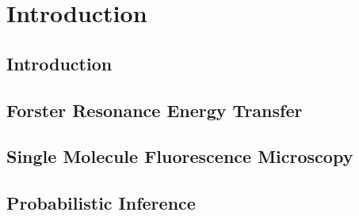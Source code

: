 \chapter{Introduction}
\section{Introduction}
\section{Forster Resonance Energy Transfer}
\section{Single Molecule Fluorescence Microscopy}
\section{Probabilistic Inference}
